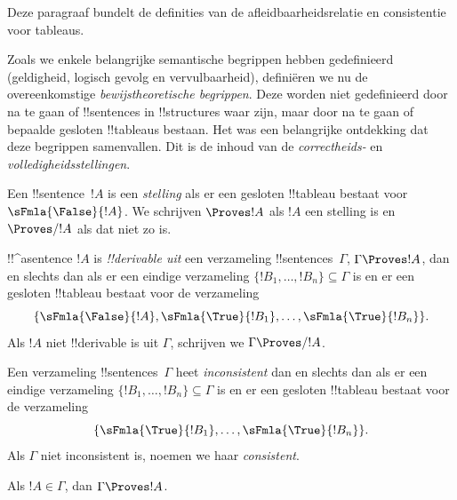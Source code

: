 \documentclass[../../../include/open-logic-section]{subfiles}
\begin{document}
      {}
      {}
      

\begin{editorial}
Deze paragraaf bundelt de definities van de afleidbaarheidsrelatie
en consistentie voor tableaus.
\end{editorial}

\begin{explain}
Zoals we enkele belangrijke semantische begrippen hebben gedefinieerd
(geldigheid, logisch gevolg en vervulbaarheid), definiëren we nu de
overeenkomstige \emph{bewijstheoretische begrippen}. Deze worden niet
gedefinieerd door na te gaan of !!{sentence}s in !!{structure}s waar
zijn, maar door na te gaan of bepaalde gesloten !!{tableau}s bestaan.
Het was een belangrijke ontdekking dat deze begrippen samenvallen. Dit
is de inhoud van de \emph{correctheids-} en
\emph{volledigheidsstellingen}.
\end{explain}


\begin{defn}[Stellingen]
Een !!{sentence}~$!A$ is een \emph{stelling} als er een gesloten
!!{tableau} bestaat voor~$\sFmla{\False}{!A}$. We schrijven
$\Proves !A$ als $!A$ een stelling is en $\Proves/ !A$ als dat niet
zo is.
\end{defn}

\begin{defn}[!!^{derivability}]
!!^a{sentence} $!A$ is \emph{!!{derivable} uit} een verzameling
!!{sentence}s~$\Gamma$, $\Gamma \Proves !A$, dan en slechts dan als er
een eindige verzameling $\{!B_1, \dots, !B_n\} \subseteq \Gamma$ is
en er een gesloten !!{tableau} bestaat voor de verzameling
\[
\{
  \sFmla{\False}{!A},
  \sFmla{\True}{!B_1}, \dots,
  \sFmla{\True}{!B_n}
  \}.
\]
Als $!A$ niet !!{derivable} is uit $\Gamma$, schrijven we
$\Gamma \Proves/ !A$.
\end{defn}

\begin{defn}[Consistentie]
Een verzameling !!{sentence}s~$\Gamma$ heet \emph{inconsistent} dan en
slechts dan als er een eindige verzameling
$\{!B_1, \dots, !B_n\} \subseteq \Gamma$ is en er een gesloten
!!{tableau} bestaat voor de verzameling
\[
\{
  \sFmla{\True}{!B_1}, \dots,
  \sFmla{\True}{!B_n}  
  \}.
\]
Als $\Gamma$ niet inconsistent is, noemen we haar \emph{consistent}.
\end{defn}

\begin{prop}[Reflexiviteit]
Als $!A \in \Gamma$, dan $\Gamma \Proves !A$.
\end{prop}
\end{document}
